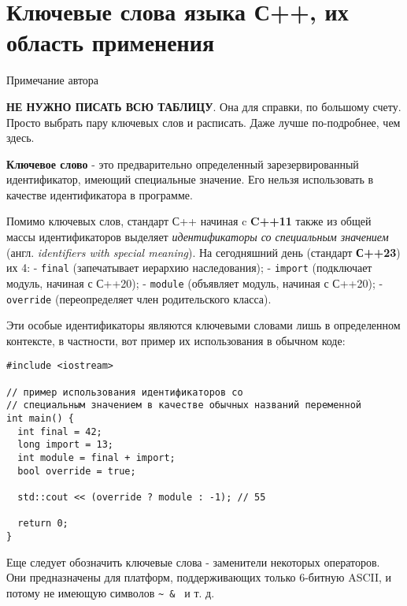 \section{Ключевые слова языка С++, их область применения}

Примечание автора

\textbf{НЕ НУЖНО ПИСАТЬ ВСЮ ТАБЛИЦУ}. Она для справки, по большому
счету. Просто выбрать пару ключевых слов и расписать. Даже лучше
по-подробнее, чем здесь.

\textbf{Ключевое слово} - это предварительно определенный
зарезервированный идентификатор, имеющий специальные значение. Его
нельзя использовать в качестве идентификатора в программе.

Помимо ключевых слов, стандарт С++ начиная c \textbf{C++11} также из
общей массы идентификаторов выделяет \emph{идентификаторы со специальным
значением} (англ. \emph{identifiers with special meaning}). На
сегодняшний день (стандарт \textbf{С++23}) их 4: - \texttt{final}
(запечатывает иерархию наследования); - \texttt{import} (подключает
модуль, начиная с С++20); - \texttt{module} (объявляет модуль, начиная с
С++20); - \texttt{override} (переопределяет член родительского класса).

Эти особые идентификаторы являются ключевыми словами лишь в определенном
контексте, в частности, вот пример их использования в обычном коде:

\begin{verbatim}
#include <iostream>

// пример использования идентификаторов со
// специальным значением в качестве обычных названий переменной
int main() {
  int final = 42;
  long import = 13;
  int module = final + import;
  bool override = true;

  std::cout << (override ? module : -1); // 55

  return 0;
}
\end{verbatim}

Еще следует обозначить ключевые слова - заменители некоторых операторов.
Они предназначены для платформ, поддерживающих только 6-битную ASCII, и
потому не имеющую символов \texttt{\textasciitilde{}\ \&\ \textbar{}} и
т. д.

